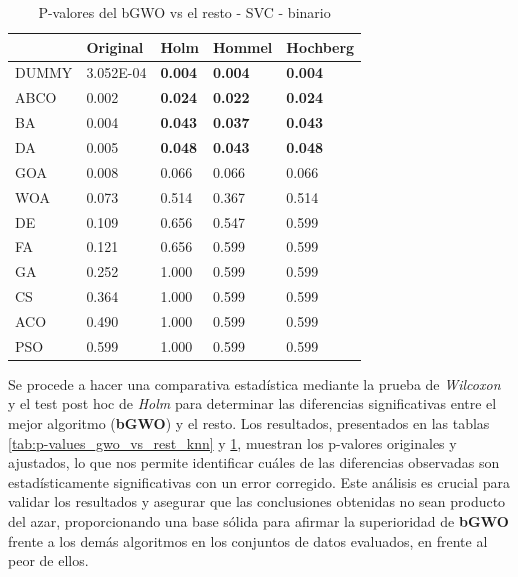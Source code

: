\begin{table}[htp]
    \centering
    \begin{tabular}{lllll}
        \toprule
        {}    & Original  & Holm           & Hommel         & Hochberg       \\
        \midrule
        DUMMY & 3.052E-04 & \textbf{0.004} & \textbf{0.004} & \textbf{0.004} \\
        ABCO  & 0.002     & \textbf{0.024} & \textbf{0.022} & \textbf{0.024} \\
        BA    & 0.004     & \textbf{0.043} & \textbf{0.037} & \textbf{0.043} \\
        DA    & 0.005     & \textbf{0.048} & \textbf{0.043} & \textbf{0.048} \\
        GOA   & 0.008     & 0.066          & 0.066          & 0.066          \\
        WOA   & 0.073     & 0.514          & 0.367          & 0.514          \\
        DE    & 0.109     & 0.656          & 0.547          & 0.599          \\
        FA    & 0.121     & 0.656          & 0.599          & 0.599          \\
        GA    & 0.252     & 1.000          & 0.599          & 0.599          \\
        CS    & 0.364     & 1.000          & 0.599          & 0.599          \\
        ACO   & 0.490     & 1.000          & 0.599          & 0.599          \\
        PSO   & 0.599     & 1.000          & 0.599          & 0.599          \\
        \bottomrule
    \end{tabular}
    \caption{P-valores del bGWO vs el resto - SVC - binario}
    \label{tab:p-values_gwo_vs_rest_svc}
\end{table}


Se procede a hacer una comparativa estadística mediante la prueba de \textit{Wilcoxon} y el test post hoc de \textit{Holm} para determinar las diferencias significativas entre el mejor algoritmo (\textbf{bGWO}) y el resto. Los resultados, presentados en las tablas \ref{tab:p-values_gwo_vs_rest_knn} y \ref{tab:p-values_gwo_vs_rest_svc}, muestran los p-valores originales y ajustados, lo que nos permite identificar cuáles de las diferencias observadas son estadísticamente significativas con un error corregido. Este análisis es crucial para validar los resultados y asegurar que las conclusiones obtenidas no sean producto del azar, proporcionando una base sólida para afirmar la superioridad de \textbf{bGWO} frente a los demás algoritmos en los conjuntos de datos evaluados, en frente al peor de ellos.\\[6pt]

